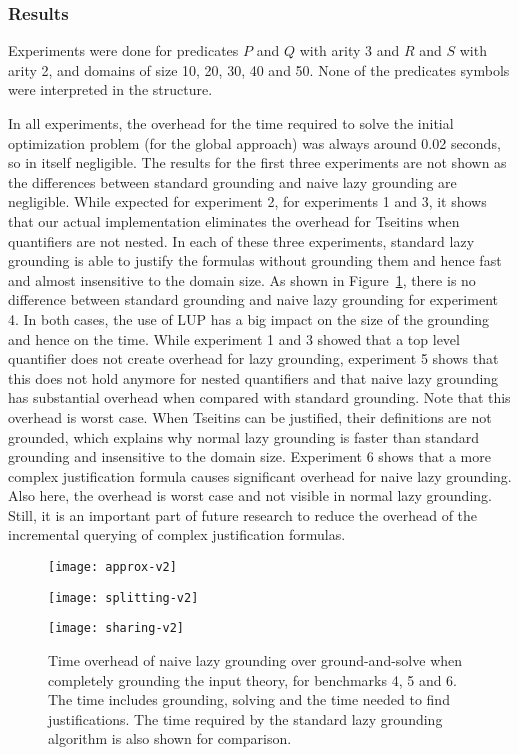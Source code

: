 \documentclass[11pt]{article}
\theoremstyle{plain}
\theoremstyle{definition}
\theoremstyle{example_basic}
\theoremstyle{example_contd}
\theoremstyle{plain}
\newcommand{\change}[1]{#1}
\begin{document}
\subsubsection{Results}
Experiments were done \change{for predicates $P$ and $Q$ with arity 3 and $R$ and $S$ with arity 2,} and domains of size 10, 20, 30, 40 and 50. \change{None of the predicates symbols were interpreted in the structure.}

In all experiments, the overhead for the time required to solve the
initial optimization problem (for the global approach) was always
around 0.02 seconds, so in itself negligible.
\change{The results for the first three experiments are not shown as
the differences between standard grounding and naive lazy grounding
are negligible. While expected for experiment 2, for experiments 1 and
3, it shows that our actual implementation eliminates the overhead
for Tseitins when quantifiers are not nested.  
In each of these three experiments, standard lazy grounding is able to
justify the formulas without grounding them and hence fast and
almost insensitive to the domain size.
As shown in Figure~\ref{overhead}, there is no difference between
standard grounding and naive lazy grounding for experiment 4. In
both cases, the use of LUP has a big impact on the size of the
grounding and hence on the time.
While experiment 1 and 3 showed that a top level quantifier does not
create overhead for lazy grounding, experiment 5 shows that this does
not hold anymore for nested quantifiers and that naive lazy grounding
has substantial overhead when compared with standard grounding. Note
that this overhead is worst case. When Tseitins can be justified,
their definitions are not grounded, which explains why normal lazy
grounding is faster than standard grounding and insensitive to the
domain size.
Experiment 6 shows that a more complex justification formula causes
significant overhead for naive lazy grounding. Also here, the overhead
is worst case and not visible in normal lazy grounding. Still, it is
an important part of future research to reduce the overhead of the
incremental querying of complex justification formulas.}

\begin{figure}
\centering
\begin{minipage}{0.32\textwidth}
\centering
\texttt{[image: approx-v2]}
\end{minipage}
\begin{minipage}{0.32\textwidth}
\centering
\texttt{[image: splitting-v2]}
\end{minipage}
\begin{minipage}{0.32\textwidth}
\centering
\texttt{[image: sharing-v2]}
\end{minipage}
\vspace{5pt}
\caption{Time overhead of \change{naive} lazy grounding over ground-and-solve when completely grounding the input theory, for benchmarks 4, 5 and 6. The time includes grounding, solving and the time needed to find justifications. The time required by the standard lazy grounding algorithm is also shown for comparison.}
\label{overhead}
\end{figure} 
\end{document}
